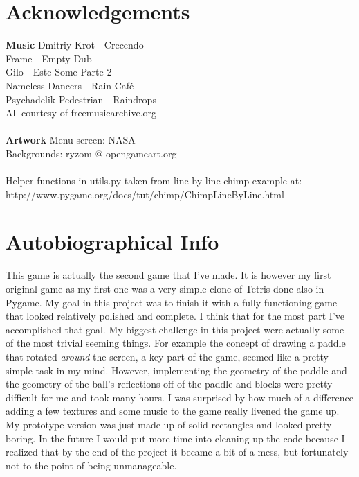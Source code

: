 \documentclass[11pt]{article}
\begin{document}
\section{Acknowledgements}
\textbf{Music}
Dmitriy Krot - Crecendo\\
Frame - Empty Dub\\
Gilo - Este Some Parte 2\\
Nameless Dancers - Rain Caf\'e\\
Psychadelik Pedestrian - Raindrops\\
All courtesy of freemusicarchive.org\\
\\
\textbf{Artwork}
Menu screen: NASA\\
Backgrounds: ryzom @ opengameart.org\\
\\
Helper functions in utils.py taken from line by line chimp example at:\\ http://www.pygame.org/docs/tut/chimp/ChimpLineByLine.html\\


\section{Autobiographical Info}
This game is actually the second game that I've made. It is however my first original game as my first one was a very simple clone of Tetris done also in Pygame. My goal in this project was to finish it with a fully functioning game that looked relatively polished and complete. I think that for the most part I've accomplished that goal. My biggest challenge in this project were actually some of the most trivial seeming things. For example the concept of drawing a paddle that rotated \textit{around} the screen, a key part of the game, seemed like a pretty simple task in my mind. However, implementing the geometry of the paddle and the geometry of the ball's reflections off of the paddle and blocks were pretty difficult for me and took many hours. I was surprised by how much of a difference adding a few textures and some music to the game really livened the game up. My prototype version was just made up of solid rectangles and looked pretty boring. In the future I would put more time into cleaning up the code because I realized that by the end of the project it became a bit of a mess, but fortunately not to the point of being unmanageable.
\end{document}
